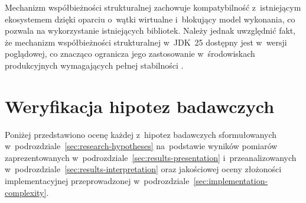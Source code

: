 Mechanizm współbieżności strukturalnej zachowuje kompatybilność z~istniejącym ekosystemem dzięki oparciu o~wątki wirtualne i~blokujący model wykonania, co pozwala na wykorzystanie istniejących bibliotek. Należy jednak uwzględnić fakt, że mechanizm współbieżności strukturalnej w~JDK~25 dostępny jest w~wersji poglądowej, co znacząco ogranicza jego zastosowanie w~środowiskach produkcyjnych wymagających pełnej stabilności \cite{jep525}.

\section{Weryfikacja hipotez badawczych}
\label{sec:hypothesis-verification}

Poniżej przedstawiono ocenę każdej z~hipotez badawczych sformułowanych w~podrozdziale~\ref{sec:research-hypotheses} na~podstawie wyników pomiarów zaprezentowanych w~podrozdziale~\ref{sec:results-presentation} i~przeanalizowanych w~podrozdziale~\ref{sec:results-interpretation} oraz jakościowej oceny złożoności implementacyjnej przeprowadzonej w~podrozdziale~\ref{sec:implementation-complexity}.

